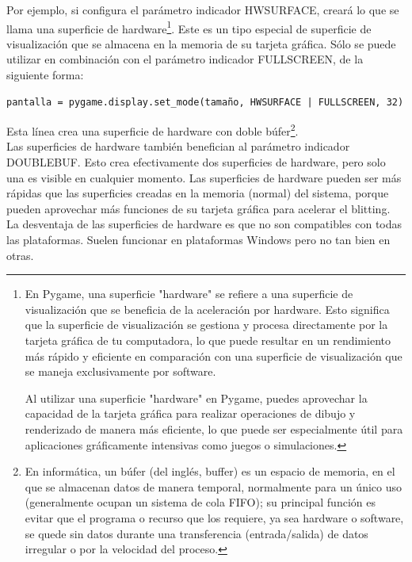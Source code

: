 Por ejemplo, si configura el parámetro indicador {\ttfamily HWSURFACE}, creará lo que se llama una superficie de {\ttfamily hardware}\footnote{En Pygame, una superficie "{}hardware"{} se refiere a una superficie de visualización que se beneficia de la aceleración por hardware. Esto significa que la superficie de visualización se gestiona y procesa directamente por la tarjeta gráfica de tu computadora, lo que puede resultar en un rendimiento más rápido y eficiente en comparación con una superficie de visualización que se maneja exclusivamente por software.


Al utilizar una superficie "{}hardware"{} en Pygame, puedes aprovechar la capacidad de la tarjeta gráfica para realizar operaciones de dibujo y renderizado de manera más eficiente, lo que puede ser especialmente útil para aplicaciones gráficamente intensivas como juegos o simulaciones.}. Este es un tipo especial  de superficie de visualización que se almacena en la memoria de su tarjeta gráfica. Sólo se puede utilizar en combinación con el parámetro indicador {\ttfamily FULLSCREEN}, de la siguiente forma:
\begin{lstlisting}		
pantalla = pygame.display.set_mode(tamaño, HWSURFACE | FULLSCREEN, 32)
\end{lstlisting}
Esta línea crea una superficie de {\ttfamily hardware} con doble {\ttfamily  búfer}\footnote{En informática, un búfer (del inglés, buffer) es un espacio de memoria, en el que se almacenan datos de manera temporal, normalmente para un único uso (generalmente ocupan un sistema de cola FIFO); su principal función es evitar que el programa o recurso que los requiere, ya sea hardware o software, se quede sin datos durante una transferencia (entrada/salida) de datos irregular o por la velocidad del proceso.}. \\   


Las superficies de {\ttfamily hardware} también benefician al parámetro indicador {\ttfamily DOUBLEBUF}. Esto crea efectivamente dos superficies de {\ttfamily hardware}, pero solo una es visible en cualquier momento. 
Las superficies de  {\ttfamily hardware} pueden ser más rápidas que las superficies creadas en la memoria (normal) del sistema,
porque pueden aprovechar más funciones de su tarjeta gráfica para acelerar el blitting.
La desventaja de las superficies de  {\ttfamily hardware} es que no son  compatibles con todas las plataformas.
Suelen funcionar en plataformas Windows pero no tan bien en otras. \\

